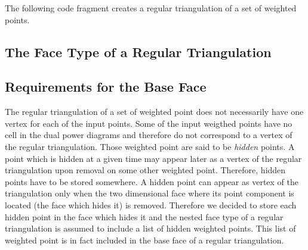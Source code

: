 


\ccExample
The following code fragment creates a regular triangulation 
of a set of weighted points.







\subsection{The Face Type of a Regular Triangulation}

\subsection{Requirements for the Base Face}
The regular triangulation of a set of weighted point does not
necessarily
have one vertex for each of the input points. Some of the input
weigthed points have no cell in the dual power diagrams
and therefore do not correspond to a vertex of the regular
triangulation.
Those weighted point are said to be {\it hidden} points.
A  point which is hidden at a given time may appear later as a vertex of
the regular triangulation upon removal on some other weighted point.
Therefore, hidden points have to be stored somewhere.
A hidden point can appear as vertex of the triangulation
only when the
two dimensional face where its point component is located
(the face which hides it)
is removed. Therefore we decided to store each hidden point
in the face which  hides it and the nested face type of a 
regular triangulation is assumed to include a list of hidden 
weighted points. This list of weighted point is in fact included
in the base face of a regular triangulation.

